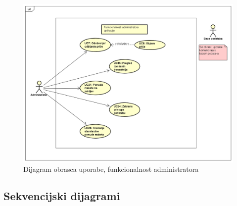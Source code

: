 					\begin{figure}[H]
						\includegraphics[width=.9\linewidth]{slike/Funkcionalnost_administratora_sustava.PNG} %
						\caption{Dijagram obrasca uporabe, funkcionalnost administratora}
						\label{fig:obrupo2} %
					\end{figure}

				\eject		
				
			\subsection{Sekvencijski dijagrami}
				
